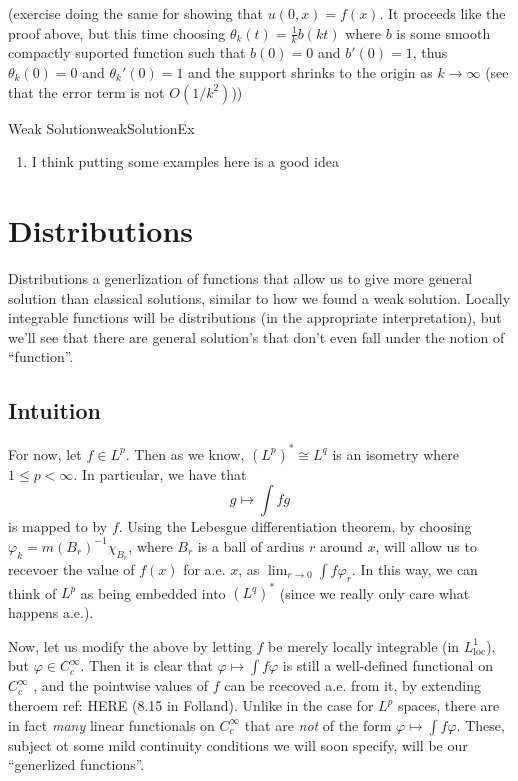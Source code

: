 \documentclass{book}
\renewcommand{\phi}{\varphi}
\newcommand{\rw}{\rightarrow}
\begin{document}
 (exercise doing the same for showing that $u(0,x) = f(x)$. It proceeds like the proof above, but this time choosing
 $\theta_k(t) = \frac{1}{k} b(kt)$ where $b$ is some smooth compactly suported function such that $b(0) = 0$ and $b'(0)
 =1$, thus $\theta_k(0) = 0$ and $\theta_k'(0) = 1$ and the support shrinks to the origin as $k \rw \infty$ (see that
 the error term is not $O(1/k^2)$))

\begin{example}{Weak Solution}{weakSolutionEx}
	\begin{enumerate}
		\item I think putting some examples here is a good idea
	\end{enumerate}
\end{example}

\section{Distributions}


Distributions a generlization of functions that allow us to give more general solution than classical solutions,
similar to how we found a weak solution. Locally integrable functions will be distributions (in the
appropriate interpretation), but we'll see that there are general solution's that don't even fall under the notion of
``function''.

\subsection{Intuition}

For now, let $f \in L^p$. Then as we know, $(L^p)^* \cong L^q$ is an isometry where $1 \le p < \infty$. In particular,
we have that
\[
	g\mapsto \int fg
\]
is mapped to by $f$. Using the Lebesgue differentiation theorem, by
choosing $\phi_k = m(B_r)^{-1}\chi_{B_r}$, where $B_r$ is a ball of ardius $r$ around $x$, will allow us to recevoer the
value of $f(x)$ for a.e. $x$, as $\lim_{r \rw 0} \int f\phi_r$. In this way, we can think of $L^p$ as being embedded
into $(L^q)^*$ (since we really only care what happens a.e.).

Now, let us modify the above by letting $f$ be merely locally integrable (in $L_{\text{loc}}^1$), but $\phi \in
C_c^\infty$. Then it is clear that $\phi \mapsto \int f\phi$ is still a well-defined functional on $C_c^\infty$
,  and  the pointwise  values  of $ f$  can be  rcecoved  a.e. from it, by extending theroem ref: HERE (8.15 in
Folland). Unlike in the case for $L^p$ spaces, there are in fact \emph{many} linear functionals on $C_c^\infty$ that are
\emph{not} of the form $\phi \mapsto \int f\phi$. These, subject ot some mild continuity conditions we will soon
specify, will be our ``generlized functions''.
\end{document}
